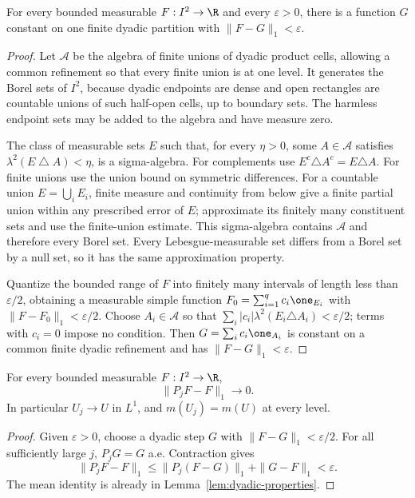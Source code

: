\begin{lemma}
\label{lem:dyadic-density}
\proved For every bounded measurable $F:I^2\to\R$ and every $\varepsilon>0$, there is a
function $G$ constant on one finite dyadic partition with $\|F-G\|_1<\varepsilon$.
\end{lemma}
\begin{proof}
Let $\mathcal A$ be the algebra of finite unions of dyadic product cells, allowing a common
refinement so that every finite union is at one level.  It generates the Borel sets of
$I^2$, because dyadic endpoints are dense and open rectangles are countable unions of such
half-open cells, up to boundary sets.  The harmless endpoint sets may be added to the
algebra and have measure zero.

The class of measurable sets $E$ such that, for every $\eta>0$, some $A\in\mathcal A$
satisfies $\lambda^2(E\mathbin\triangle A)<\eta$, is a sigma-algebra.  For complements use
$E^c\triangle A^c=E\triangle A$.  For finite unions use the union bound on symmetric
differences.  For a countable union $E=\bigcup_iE_i$, finite measure and continuity from
below give a finite partial union within any prescribed error of $E$; approximate its
finitely many constituent sets and use the finite-union estimate.  This sigma-algebra
contains $\mathcal A$ and therefore every Borel set.  Every Lebesgue-measurable set differs
from a Borel set by a null set, so it has the same approximation property.

Quantize the bounded range of $F$ into finitely many intervals of length less than
$\varepsilon/2$, obtaining a measurable simple function
$F_0=\sum_{i=1}^q c_i\one_{E_i}$ with $\|F-F_0\|_1<\varepsilon/2$.
Choose $A_i\in\mathcal A$ so that
$\sum_i|c_i|\lambda^2(E_i\triangle A_i)<\varepsilon/2$; terms with $c_i=0$ impose no
condition.  Then $G=\sum_i c_i\one_{A_i}$ is constant on a common finite dyadic refinement
and has $\|F-G\|_1<\varepsilon$.
\end{proof}

\begin{lemma}
\label{lem:dyadic-convergence}
\proved For every bounded measurable $F:I^2\to\R$,
\[
 \|P_jF-F\|_1\longrightarrow0.
\]
In particular $U_j\to U$ in $L^1$, and $m(U_j)=m(U)$ at every level.
\end{lemma}
\begin{proof}
Given $\varepsilon>0$, choose a dyadic step $G$ with $\|F-G\|_1<\varepsilon/2$.
For all sufficiently large $j$, $P_jG=G$ a.e.  Contraction gives
\[
 \|P_jF-F\|_1
 \le\|P_j(F-G)\|_1+\|G-F\|_1<\varepsilon.
\]
The mean identity is already in Lemma~\ref{lem:dyadic-properties}.
\end{proof}

